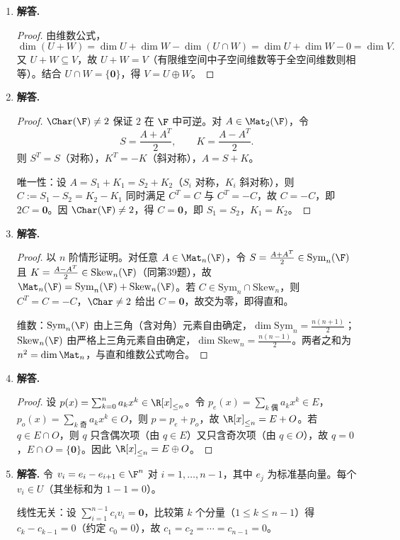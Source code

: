 \begin{enumerate}[label=\textbf{\arabic*.}, leftmargin=*, itemsep=1em]
\item \textbf{解答.}
\begin{proof}
由维数公式，
\[
\dim(U+W)=\dim U+\dim W-\dim(U\cap W)=\dim U+\dim W-0=\dim V.
\]
又 $U+W\subseteq V$，故 $U+W=V$（有限维空间中子空间维数等于全空间维数则相等）。结合 $U\cap W=\{\mathbf{0}\}$，得 $V=U\oplus W$。
\end{proof}

\item \textbf{解答.}
\begin{proof}
$\Char(\F)\ne 2$ 保证 $2$ 在 $\F$ 中可逆。对 $A\in\Mat_2(\F)$，令
\[
S=\frac{A+A^T}{2},\qquad K=\frac{A-A^T}{2}.
\]
则 $S^T=S$（对称），$K^T=-K$（斜对称），$A=S+K$。

唯一性：设 $A=S_1+K_1=S_2+K_2$（$S_i$ 对称，$K_i$ 斜对称），则 $C:=S_1-S_2=K_2-K_1$ 同时满足 $C^T=C$ 与 $C^T=-C$，故 $C=-C$，即 $2C=\mathbf{0}$。因 $\Char(\F)\ne 2$，得 $C=\mathbf{0}$，即 $S_1=S_2$，$K_1=K_2$。
\end{proof}

\item \textbf{解答.}
\begin{proof}
以 $n$ 阶情形证明。对任意 $A\in\Mat_n(\F)$，令 $S=\frac{A+A^T}{2}\in\mathrm{Sym}_n(\F)$ 且 $K=\frac{A-A^T}{2}\in\mathrm{Skew}_n(\F)$（同第39题），故 $\Mat_n(\F)=\mathrm{Sym}_n(\F)+\mathrm{Skew}_n(\F)$。若 $C\in\mathrm{Sym}_n\cap\mathrm{Skew}_n$，则 $C^T=C=-C$，$\Char\ne 2$ 给出 $C=\mathbf{0}$，故交为零，即得直和。

维数：$\mathrm{Sym}_n(\F)$ 由上三角（含对角）元素自由确定，$\dim\mathrm{Sym}_n=\frac{n(n+1)}{2}$；$\mathrm{Skew}_n(\F)$ 由严格上三角元素自由确定，$\dim\mathrm{Skew}_n=\frac{n(n-1)}{2}$。两者之和为 $n^2=\dim\Mat_n$，与直和维数公式吻合。
\end{proof}

\item \textbf{解答.}
\begin{proof}
设 $p(x)=\sum_{k=0}^n a_kx^k\in\R[x]_{\le n}$。令 $p_e(x)=\sum_{k\text{ 偶}}a_kx^k\in E$，$p_o(x)=\sum_{k\text{ 奇}}a_kx^k\in O$，则 $p=p_e+p_o$，故 $\R[x]_{\le n}=E+O$。若 $q\in E\cap O$，则 $q$ 只含偶次项（由 $q\in E$）又只含奇次项（由 $q\in O$），故 $q=0$，$E\cap O=\{\mathbf{0}\}$。因此 $\R[x]_{\le n}=E\oplus O$。
\end{proof}

\item \textbf{解答.}
令 $v_i=e_i-e_{i+1}\in\F^n$ 对 $i=1,\dots,n-1$，其中 $e_j$ 为标准基向量。每个 $v_i\in U$（其坐标和为 $1-1=0$）。

线性无关：设 $\sum_{i=1}^{n-1}c_iv_i=\mathbf{0}$，比较第 $k$ 个分量（$1\le k\le n-1$）得 $c_k-c_{k-1}=0$（约定 $c_0=0$），故 $c_1=c_2=\cdots=c_{n-1}=0$。


\end{enumerate}
